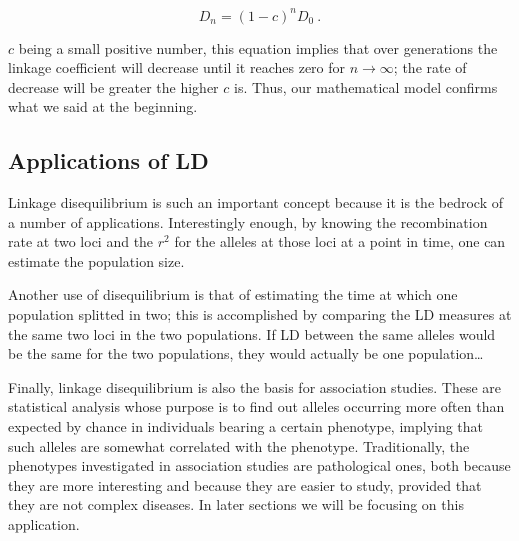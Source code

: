 \documentclass[../main.tex]{subfiles}
\begin{document}
\begin{equation}
\label{eq:linkagecoeffrecomb}
D_n = (1 - c)^n D_0\ .
\end{equation}

\(c\) being a small positive number, this equation implies that over 
generations the linkage coefficient will decrease until it reaches zero 
for \(n \to \infty\); the rate of decrease will be greater the higher 
\(c\) is. Thus, our mathematical model confirms what we said at the 
beginning.



\subsection{Applications of LD}


Linkage disequilibrium is such an important concept because it is the 
bedrock of a number of applications. Interestingly enough, by knowing 
the recombination rate at two loci and the \(r^2\) for the alleles at 
those loci at a point in time, one can estimate the population size.

Another use of disequilibrium is that of estimating the time at which 
one population splitted in two; this is accomplished by comparing the LD 
measures at the same two loci in the two populations. If LD between the 
same alleles would be the same for the two populations, they would 
actually be one population\ldots

Finally, linkage disequilibrium is also the basis for association 
studies. These are statistical analysis whose purpose is to find out 
alleles occurring more often than expected by chance in individuals 
bearing a certain phenotype, implying that such alleles are somewhat 
correlated with the phenotype. Traditionally, the phenotypes 
investigated in association studies are pathological ones, both because 
they are more interesting and because they are easier to study, provided 
that they are not complex diseases. In later sections we will be 
focusing on this application.


\end{document}
